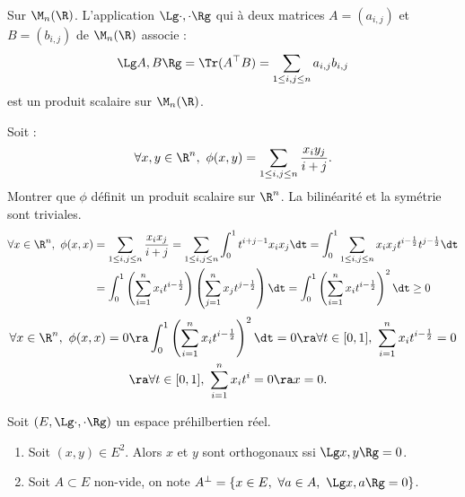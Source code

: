 \documentclass[11pt]{article}
\begin{document}
\begin{defi}{Sur $\M_n(\R)$.}{}
    L'application $\Lg \cdot,\cdot \Rg$ qui à deux matrices $A=(a_{i,j})$ et $B=(b_{i,j})$ de $\M_n(\R)$ associe :
    \begin{equation*}
        \Lg A, B \Rg = \Tr(A^\top B) = \sum_{1\leq i,j \leq n} a_{i,j}b_{i,j}
    \end{equation*}
    est un produit scalaire sur $\M_n(\R)$.
\end{defi}

\begin{ex}{}{}
    Soit :
    \begin{equation*}
        \forall x,y \in \R^n, ~ \phi(x,y) = \sum_{1\leq i,j \leq n}\frac{x_i y_j}{i + j}.
    \end{equation*}
    Montrer que $\phi$ définit un produit scalaire sur $\R^n$.
    \tcblower
    La bilinéarité et la symétrie sont triviales.
    \begin{align*}
        \forall x \in \R^n, ~ \phi(x,x) &= \sum_{1\leq i,j \leq n}\frac{x_ix_j}{i+j}= \sum_{1\leq i,j \leq n} \int_0^1t^{i+j-1}x_ix_j\dt=\int_0^1 \sum_{1\leq i,j \leq n} x_i x_j t^{i-\frac{1}{2}}t^{j-\frac{1}{2}}\dt\\
        &=\int_0^1\left( \sum_{i=1}^n x_it^{i-\frac{1}{2}} \right)\left( \sum_{j=1}^nx_j t^{j-\frac{1}{2}} \right)\dt = \int_0^1 \left( \sum_{i=1}^n x_i t^{i-\frac{1}{2}} \right)^2\dt \geq 0
    \end{align*}
    \begin{align*}
        \forall x \in \R^n, ~ \phi(x,x) = 0 &\ra \int_0^1\left( \sum_{i=1}^n x_it^{i-\frac{1}{2}} \right)^2\dt=0 \ra \forall t \in [0,1], ~ \sum_{i=1}^n x_i t^{i-\frac{1}{2}}=0\\
    &\ra \forall t \in [0,1], ~ \sum_{i=1}^n x_it^i = 0 \ra x=0.
    \end{align*}
\end{ex}

\begin{defi}{}{}
    Soit $(E,\Lg \cdot, \cdot \Rg)$ un espace préhilbertien réel.
    \begin{enumerate}
        \item Soit $(x,y) \in E^2$. Alors $x$ et $y$ sont orthogonaux ssi $\Lg x,y \Rg = 0$.
        \item Soit $A\subset E$ non-vide, on note $A^\bot = \{x \in E, ~ \forall a \in A, ~ \Lg x, a \Rg = 0\}$.
    \end{enumerate}
\end{defi}
\end{document}
